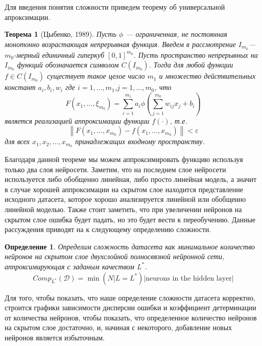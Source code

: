 \documentclass[a4paper,14pt]{extarticle}
\newtheorem{theorem}{Теорема}
\newtheorem{definition}{Определение}[section]
\numberwithin{equation}{section}
\begin{document}
Для введения понятия сложности приведем теорему об универсальной апроксимации.
\begin{theorem}[Цыбенко, 1989]
	Пусть $\phi$ --- ограниченная, не постоянная монотонно возрастающая непрерывная функция. Введем в рассмотрение $I_{m_0}$--- $m_0$-мерный единичный гиперкуб $[0,1]^{m_0}$. Пусть пространство непрерывных на  $I_{m_0}$ функций обозначается символом $C(I_{m_0})$. Тогда для любой функции $f \in C(I_{m_0})$ существует такое целое число $m_1$  и множество действительных констант $a_i,b_i,w_i$ где $i=1,\dots,m_1$,$j =  1,\dots,m_0$, что
	\begin{equation}
	F(x_1,\dots,\xi_{m_0}) = \sum_{i=1}^{m_1}a_i\phi\left(\sum_{j=1}^{m_0}w_{ij}x_j+b_i\right)
	\end{equation}
	является реализацией аппроксимации функции $f(\cdot)$, т.е.
	\begin{equation}
	\left\| F(x_1,\dots,x_{m_0}) - f(x_1,\dots,x_{m_0}) \right\| < \varepsilon
	\end{equation}
	 для всех $x_1,x_2,\dots,x_{m_0}$ принадлежащих входному пространству.
	
	
	
\end{theorem}

Благодаря данной теореме мы можем аппроксимировать функцию используя только два слоя нейросети. Заметим, что на последнем слое нейросети используется либо обобщенно линейная, либо просто линейная модель, а значит в случае хорошей аппроксимации на скрытом слое находится представление исходного датасета, которое хорошо анализируется линейной или обобщенно линейной моделью. Также стоит заметить, что при увеличении нейронов на скрытом слое ошибка будет падать, но это будет вести к переобучению. Данные рассуждения приводят на к следующему определению сложности.

\begin{definition}
	\label{def1}
	Определим сложность датасета как минимальное количество нейронов на скрытом слое двухслойной полносвязной нейронной сети, аппроксимирующая с заданым качеством $L^*$.
	\begin{equation}
	Comp_{L^*}(\mathcal{D}) = \min (N|L = L^*)\text{|neurons in the hidden layer|}
	\end{equation}
\end{definition}
Для того, чтобы показать, что наше определение сложности датасета корректно, строится графики зависимости дисперсии ошибки и коэффициент детерминации от количества нейронов, чтобы показать, что определенное количество нейронов на скрытом слое достаточно, и, начиная с некоторого, добавление новых нейронов является избыточным. 
\end{document}
